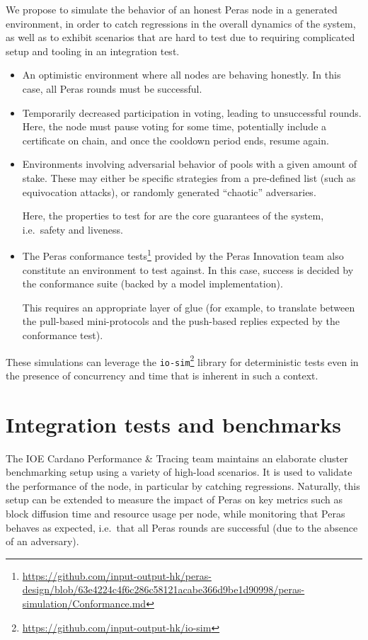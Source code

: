 We propose to simulate the behavior of an honest Peras node in a generated environment, in order to catch regressions in the overall dynamics of the system, as well as to exhibit scenarios that are hard to test due to requiring complicated setup and tooling in an integration test.

\begin{itemize}
\item
  An optimistic environment where all nodes are behaving honestly.
  In this case, all Peras rounds must be successful.
\item
  Temporarily decreased participation in voting, leading to unsuccessful rounds.
  Here, the node must pause voting for some time, potentially include a certificate on chain, and once the cooldown period ends, resume again.
\item
  Environments involving adversarial behavior of pools with a given amount of stake.
  These may either be specific strategies from a pre-defined list (such as equivocation attacks), or randomly generated \enquote{chaotic} adversaries.

  Here, the properties to test for are the core guarantees of the system, i.e.\ safety and liveness.
\item
  The Peras conformance tests\footnote{\url{https://github.com/input-output-hk/peras-design/blob/63e4224c4f6c286c58121acabe366d9be1d90998/peras-simulation/Conformance.md}} provided by the Peras Innovation team also constitute an environment to test against.
  In this case, success is decided by the conformance suite (backed by a model implementation).

  This requires an appropriate layer of glue (for example, to translate between the pull-based mini-protocols and the push-based replies expected by the conformance test).
\end{itemize}

These simulations can leverage the \texttt{io-sim}\footnote{\url{https://github.com/input-output-hk/io-sim}} library for deterministic tests even in the presence of concurrency and time that is inherent in such a context.

\section{Integration tests and benchmarks}

The IOE Cardano Performance \& Tracing team maintains an elaborate cluster benchmarking setup using a variety of high-load scenarios.
It is used to validate the performance of the node, in particular by catching regressions.
Naturally, this setup can be extended to measure the impact of Peras on key metrics such as block diffusion time and resource usage per node, while monitoring that Peras behaves as expected, i.e.\ that all Peras rounds are successful (due to the absence of an adversary).

